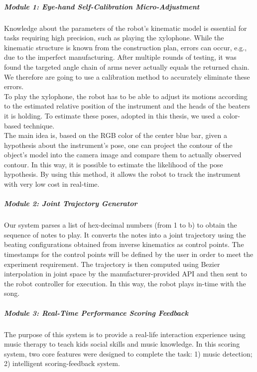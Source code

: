 \documentclass[12pt]{report}
\begin{document}
\subparagraph{Module 1: Eye-hand Self-Calibration Micro-Adjustment}
Knowledge about the parameters of the robot's kinematic model is essential for 
tasks requiring high precision, such as playing the xylophone. While the kinematic 
structure is known from the construction plan, errors can occur, e.g., due to the 
imperfect manufacturing. After multiple rounds of testing, it was found the targeted angle chain 
of arms never actually equals the returned chain. We therefore are going to use a 
calibration method to accurately eliminate these errors.\\

To play the xylophone, the robot has to be able to adjust its motions according to
the estimated relative position of the instrument and the heads of the beaters it is 
holding. To estimate these poses, adopted in this thesis, we used a color-based technique.\\

The main idea is, based on the RGB color of the center blue bar, given a hypothesis 
about the instrument's pose, one can project the contour of the object's model into the 
camera image and compare them to actually observed contour. In this way, it is possible 
to estimate the likelihood of the pose hypothesis. By using this method, it allows
the robot to track the instrument with very low cost in real-time. \\

\subparagraph{Module 2: Joint Trajectory Generator}
Our system parses a list of hex-decimal numbers (from 1 to b) to obtain the sequence
of notes to play. It converts the notes into a joint trajectory using the beating
configurations obtained from inverse kinematics as control points. The timestamps
for the control points will be defined by the user in order to meet the experiment requirement.
The trajectory is then computed using Bezier interpolation in joint space by the
manufacturer-provided API and then sent to the robot controller for execution. In this
way, the robot plays in-time with the song.\\

\subparagraph{Module 3: Real-Time Performance Scoring Feedback}
The purpose of this system is to provide a real-life interaction experience using 
music therapy to teach kids social skills and music knowledge.  In this scoring 
system, two core features were designed to complete the task: 1) music detection;
2) intelligent scoring-feedback system.\\
\end{document}
